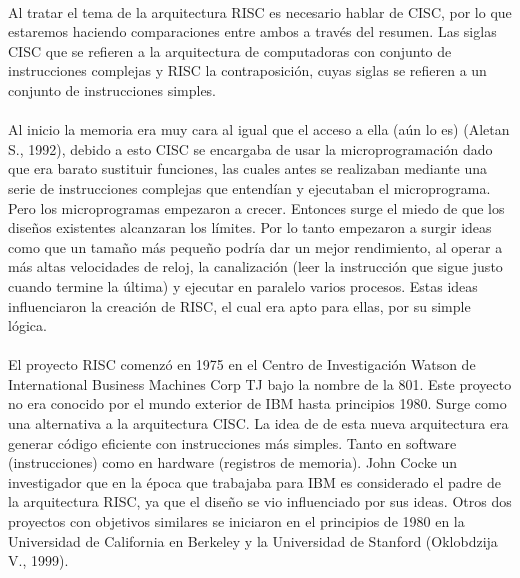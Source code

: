 \documentclass[10pt,a4paper]{article}
\begin{document}
\paragraph{}
Al tratar el tema de la arquitectura RISC es necesario hablar de CISC, por lo que estaremos haciendo comparaciones entre ambos a través del resumen. Las siglas CISC que se refieren a la arquitectura de computadoras con conjunto de instrucciones complejas y RISC la contraposición, cuyas siglas se refieren a un conjunto de instrucciones simples.

\paragraph{}
Al inicio la memoria era muy cara al igual que el acceso a ella (aún lo es) (Aletan S., 1992), debido a esto CISC se encargaba de usar la microprogramación dado que era barato sustituir funciones, las cuales antes se realizaban mediante una serie de instrucciones complejas que entendían y ejecutaban el microprograma. Pero los microprogramas empezaron a crecer. Entonces surge el miedo de que los diseños existentes alcanzaran los límites. Por lo tanto empezaron a surgir ideas como que un tamaño más pequeño podría dar un mejor rendimiento, al operar a más altas velocidades de reloj, la canalización (leer la instrucción que sigue justo cuando termine la última) y ejecutar en paralelo varios procesos. Estas ideas influenciaron la creación de RISC, el cual era apto para ellas, por su simple lógica.

\paragraph{}
El proyecto RISC comenzó en 1975 en el Centro de Investigación Watson de International Business Machines Corp TJ bajo la nombre de la 801. Este proyecto no era conocido por el mundo exterior de IBM hasta principios 1980. Surge como una alternativa a la arquitectura CISC. La idea de de esta nueva arquitectura era generar código eficiente con instrucciones más simples. Tanto en software (instrucciones) como en hardware (registros de memoria). John Cocke un investigador que en la época que trabajaba para IBM es considerado el padre de la arquitectura RISC, ya que el diseño se vio influenciado por sus ideas. Otros dos proyectos con objetivos similares se iniciaron en el principios de 1980 en la Universidad de California en Berkeley y la Universidad de Stanford (Oklobdzija V., 1999).
\end{document}
